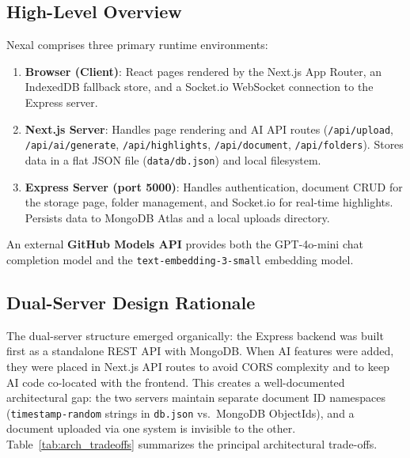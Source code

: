 \documentclass[conference]{IEEEtran}
\begin{document}
\subsection{High-Level Overview}

Nexal comprises three primary runtime environments:

\begin{enumerate}[leftmargin=*]
  \item \textbf{Browser (Client)}: React pages rendered by the Next.js App Router, an IndexedDB fallback store, and a Socket.io WebSocket connection to the Express server.
  \item \textbf{Next.js Server}: Handles page rendering and AI API routes (\texttt{/api/upload}, \texttt{/api/ai/generate}, \texttt{/api/highlights}, \texttt{/api/document}, \texttt{/api/folders}). Stores data in a flat JSON file (\texttt{data/db.json}) and local filesystem.
  \item \textbf{Express Server (port 5000)}: Handles authentication, document CRUD for the storage page, folder management, and Socket.io for real-time highlights. Persists data to MongoDB Atlas and a local uploads directory.
\end{enumerate}

An external \textbf{GitHub Models API} provides both the GPT-4o-mini chat completion model and the \texttt{text-embedding-3-small} embedding model.

\subsection{Dual-Server Design Rationale}

The dual-server structure emerged organically: the Express backend was built first as a standalone REST API with MongoDB. When AI features were added, they were placed in Next.js API routes to avoid CORS complexity and to keep AI code co-located with the frontend. This creates a well-documented architectural gap: the two servers maintain separate document ID namespaces (\texttt{timestamp-random} strings in \texttt{db.json} vs.\ MongoDB ObjectIds), and a document uploaded via one system is invisible to the other. Table~\ref{tab:arch_tradeoffs} summarizes the principal architectural trade-offs.
\end{document}
